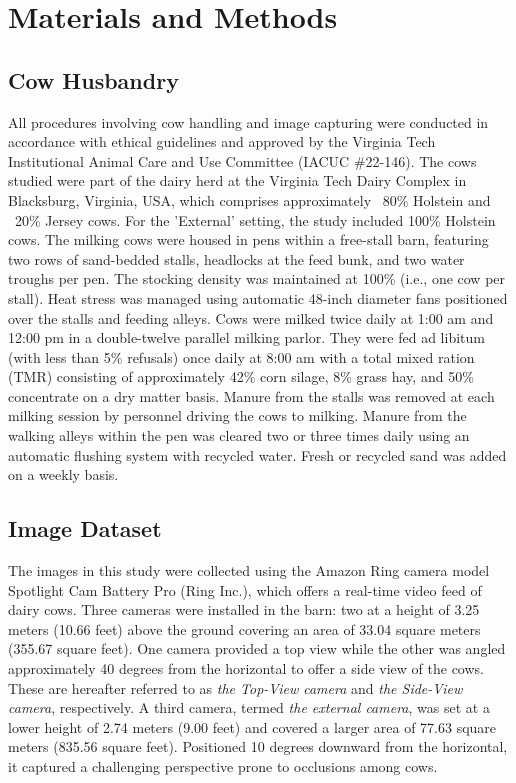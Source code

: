 \section{Materials and Methods}
\label{sec:materials_methods}

\subsection{Cow Husbandry}
All procedures involving cow handling and image capturing were conducted in accordance with ethical guidelines and approved by the Virginia Tech Institutional Animal Care and Use Committee (IACUC \#22-146). The cows studied were part of the dairy herd at the Virginia Tech Dairy Complex in Blacksburg, Virginia, USA, which comprises approximately ~80\% Holstein and ~20\% Jersey cows. For the 'External' setting, the study included  100\% Holstein cows. The milking cows were housed in pens within a free-stall barn, featuring two rows of sand-bedded stalls, headlocks at the feed bunk, and two water troughs per pen. The stocking density was maintained at 100\% (i.e., one cow per stall). Heat stress was managed using automatic 48-inch diameter fans positioned over the stalls and feeding alleys. Cows were milked twice daily at 1:00 am and 12:00 pm in a double-twelve parallel milking parlor. They were fed ad libitum (with less than 5\% refusals) once daily at 8:00 am with a total mixed ration (TMR) consisting of approximately 42\% corn silage, 8\% grass hay, and 50\% concentrate on a dry matter basis. Manure from the stalls was removed at each milking session by personnel driving the cows to milking. Manure from the walking alleys within the pen was cleared two or three times daily using an automatic flushing system with recycled water. Fresh or recycled sand was added on a weekly basis.

\subsection{Image Dataset}
The images in this study were collected using the Amazon Ring camera model Spotlight Cam Battery Pro (Ring Inc.), which offers a real-time video feed of dairy cows. Three cameras were installed in the barn: two at a height of 3.25 meters (10.66 feet) above the ground covering an area of 33.04 square meters (355.67 square feet). One camera provided a top view while the other was angled approximately 40 degrees from the horizontal to offer a side view of the cows. These are hereafter referred to as \textit{the Top-View camera} and \textit{the Side-View camera}, respectively. A third camera, termed \textit{the external camera}, was set at a lower height of 2.74 meters (9.00 feet) and covered a larger area of 77.63 square meters (835.56 square feet). Positioned 10 degrees downward from the horizontal, it captured a challenging perspective prone to occlusions among cows.

